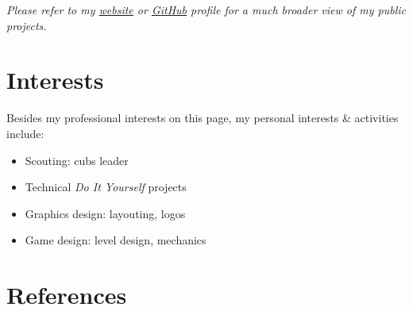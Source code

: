 \documentclass[]{cv-timvisee}
\providecommand{\tightlist}{%
\setlength{\itemsep}{0pt}\setlength{\parskip}{0pt}}
\begin{document}
\emph{Please refer to my
\href{https://timvisee.com/projects}{website} or
\href{https://github.com/timvisee}{GitHub}
profile for a much broader view of my public projects.}


\section{Interests}

Besides my professional interests on this page, my personal interests \&
activities include:

{\setlength\multicolsep{3pt}%
\begin{multicols}{2}
\begin{itemize}
  \tightlist{}
  \item Scouting: cubs leader
  \item Technical \emph{Do It Yourself} projects
  \item Graphics design: layouting, logos
  \item Game design: level design, mechanics
\end{itemize}
\end{multicols}}


\newpage

\section{References}
\end{document}
